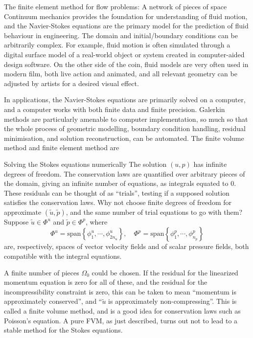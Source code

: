 \documentclass{article}
\begin{document}
\newpage
\vskip 0.2in
{\large The finite element method for flow problems: A network of pieces of space}
\vskip 0.2in
Continuum mechanics provides the foundation for understanding of fluid motion, and the Navier-Stokes equations
are the primary model for the prediction of fluid behaviour in engineering.
The domain and initial/boundary conditions can be arbitrarily complex. For example, fluid motion is often simulated
through a digital surface model of a real-world object or system created in computer-aided design software.
On the other side of the coin, fluid models are very often used in modern film, both live action and animated,
and all relevant geometry can be adjusted by artists for a desired visual effect.

In applications, the Navier-Stokes equations are primarily
solved on a computer, and a computer works with both finite data and finite precision.
Galerkin methods 
are particularly amenable to computer implementation, so much so that the whole process of geometric modelling, boundary condition handling,
residual minimisation, and solution reconstruction, can be automated. The finite volume method and finite element method are

\newpage
\vskip 0.2in
{\large Solving the Stokes equations numerically}
\vskip 0.2in
\noindent
The solution {\large $(u,p)$} has infinite degrees of freedom.
The conservation laws are quantified over arbitrary pieces of the domain,
giving an infinite number of equations, as integrals equated to $0$. These residuals can be thought of
as ``trials'', testing if a supposed solution satisfies the conservation laws.
Why not choose finite degrees of freedom for approximate {\large $(\tilde{u}, \tilde{p})$},
and the same number of trial equations to go with them?
Suppose $\tilde{u} \in \Phi^u$ and $\tilde{p} \in \Phi^p$, where
    $$\Phi^u = \text{span}\left\{\phi^u_1,\cdots,\phi^u_{2n_u}\right\},\quad 
        \Phi^p = \text{span}\left\{\phi^p_1,\cdots,\phi^p_{n_p}\right\}$$
are, respectively, spaces of vector velocity fields and of scalar pressure fields, both compatible with the integral equations.

A finite number of pieces $\Omega_0$ could be chosen.
If the residual for the linearized momentum equation is zero for all of these,
and the residual for the incompressibility constraint is zero, this can be taken to mean ``momentum is approximately conserved'',
and ``$\tilde{u}$ is approximately non-compressing''.
This is called a finite volume method, and is a good idea for conservation laws such as Poisson's equation.
A pure FVM, as just described, turns out not to lead to a stable method for the Stokes equations.
\end{document}
